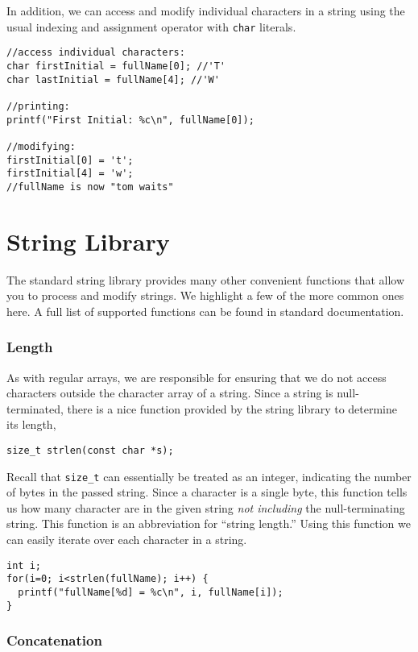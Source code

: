 In addition, we can access and modify individual characters in
a string using the usual indexing and assignment operator with
\texttt{char} literals.  

\begin{verbatim}
//access individual characters:
char firstInitial = fullName[0]; //'T'
char lastInitial = fullName[4]; //'W'

//printing:
printf("First Initial: %c\n", fullName[0]);

//modifying:
firstInitial[0] = 't';
firstInitial[4] = 'w';
//fullName is now "tom waits"
\end{verbatim}

\section{String Library}

The standard string library provides many other convenient
functions that allow you to process and modify strings.
We highlight a few of the more common ones here.  A full
list of supported functions can be found in standard 
documentation.

\subsubsection{Length}

As with regular arrays, we are responsible for ensuring
that we do not access characters outside the character array
of a string.  Since a string is null-terminated, 
there is a nice function provided by the string library to
determine its length, 

\texttt{size_t strlen(const char *s);}

Recall that \texttt{size_t} can essentially be
treated as an integer, indicating the number of bytes 
in the passed string.  Since a character is a single
byte, this function tells us how many character are in
the given string \emph{not including} the null-terminating
string.  This function is an abbreviation for
``string length.''  Using this function we can easily iterate over each 
character in a string.

\begin{verbatim}
int i;
for(i=0; i<strlen(fullName); i++) {
  printf("fullName[%d] = %c\n", i, fullName[i]);
}
\end{verbatim}

\subsubsection{Concatenation}

